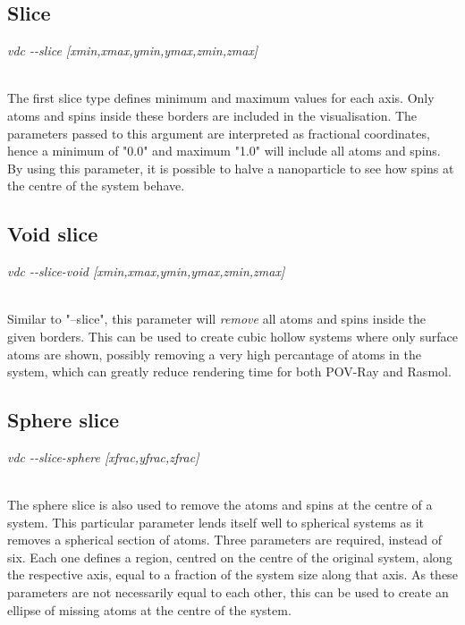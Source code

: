 \subsection*{Slice}

\begin{minipage}[c]{\textwidth}
\centering
\textit{vdc -{}-slice [xmin,xmax,ymin,ymax,zmin,zmax]}
\end{minipage}\\

The first slice type defines minimum and maximum values for each axis. Only atoms and spins inside these borders are included in the visualisation. The parameters passed to this argument are interpreted as fractional coordinates, hence a minimum of "0.0" and maximum "1.0" will include all atoms and spins. \\

By using this parameter, it is possible to halve a nanoparticle to see how spins at the centre of the system behave.\\

\subsection*{Void slice}

\begin{minipage}[c]{\textwidth}
\centering
\textit{vdc -{}-slice-void [xmin,xmax,ymin,ymax,zmin,zmax]}
\end{minipage}\\

Similar to "--slice", this parameter will \textit{remove} all atoms and spins inside the given borders. This can be used to create cubic hollow systems where only surface atoms are shown, possibly removing a very high percantage of atoms in the system, which can greatly reduce rendering time for both POV-Ray and Rasmol. \\

\subsection*{Sphere slice}

\begin{minipage}[c]{\textwidth}
\centering
\textit{vdc -{}-slice-sphere [xfrac,yfrac,zfrac]}
\end{minipage}\\

The sphere slice is also used to remove the atoms and spins at the centre of a system. This particular parameter lends itself well to spherical systems as it removes a spherical section of atoms. Three parameters are required, instead of six. Each one defines a region, centred on the centre of the original system, along the respective axis, equal to a fraction of the system size along that axis. As these parameters are not necessarily equal to each other, this can be used to create an ellipse of missing atoms at the centre of the system.

